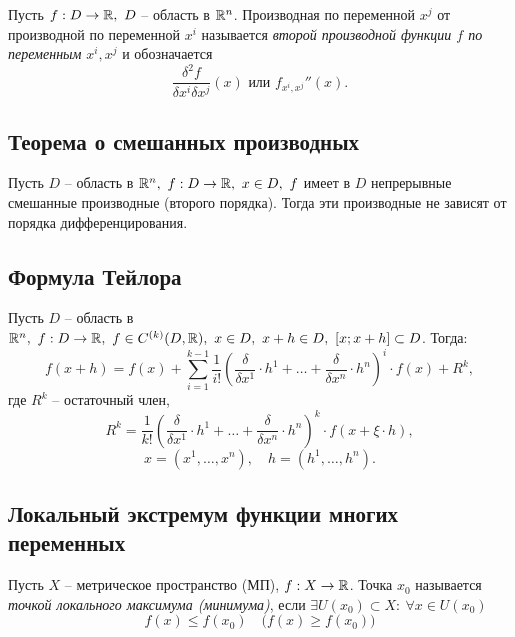 \begin{definition}
    Пусть $ f:D \rightarrow\mathbb{R}, \ D $ -- область в $ \mathbb{R}^n $. Производная по переменной $ x^j $ от производной по переменной $ x^i $ называется \emph{второй производной функции $ f $ по переменным} $ x^i,x^j $ и обозначается
    \[
        \frac{\delta^2f}{\delta x^i\delta x^j}(x)\text{ или }f_{x^i,x^j}''(x).
    \]
\end{definition}

\subsection{Теорема о смешанных производных}

\begin{theorem}
    Пусть $ D $ -- область в $ \mathbb{R}^n, \ f: D \rightarrow\mathbb{R}, \ x \in D, \ f $ имеет в $ D $ непрерывные смешанные производные (второго порядка). Тогда эти производные не зависят от порядка дифференцирования.
\end{theorem}

\subsection{Формула Тейлора}

\begin{theorem}
    Пусть $D$ -- область в $\mathbb{R}^n, \ f:D\rightarrow\mathbb{R}, \ f\in C^{(k)}(D,\mathbb{R}), \ x \in D, \ x + h \in D, \ [x;x+h] \subset D$. Тогда:
    \[
        f(x + h) = f(x) + \sum_{i=1}^{k-1}\frac{1}{i!}\left(\frac{\delta}{\delta x^1}\cdot h^1 + \ldots + \frac{\delta}{\delta x^n}\cdot h^n\right)^i \cdot f(x) + R^k,
    \]
    где $R^k$ -- остаточный член,
    \[
        R^k = \frac{1}{k!}\left(\frac{\delta}{\delta x^1}\cdot h^1 + \ldots + \frac{\delta}{\delta x^n}\cdot h^n\right)^k \cdot f(x + \xi \cdot h),
    \]
    \[
        x = (x^1,\ldots,x^n), \quad h = (h^1,\ldots,h^n).
    \]
\end{theorem}

\subsection{Локальный экстремум функции многих переменных}

\begin{definition}
    Пусть $ X $ -- метрическое пространство (МП), $ f:X \rightarrow\mathbb{R} $. Точка $ x_0 $ называется \emph{точкой локального максимума (минимума)}, если $ \exists U(x_0) \subset X: \ \forall x \in U(x_0) $
    \[
        f(x)\leqslant f(x_0) \quad \big(f(x) \geqslant f(x_0)\big)
    \]
\end{definition}

